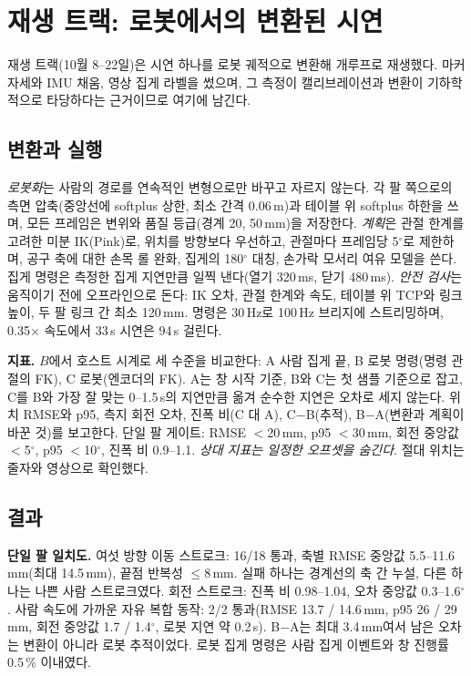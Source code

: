 \documentclass[conference,10pt]{IEEEtran}
\newcommand{\mm}{\,mm\xspace}
\begin{document}
\section{재생 트랙: 로봇에서의 변환된 시연}\label{sec:replay}
재생 트랙(10월 8--22일)은 시연 하나를 로봇 궤적으로 변환해 개루프로 재생했다. 마커 자세와 IMU 채움, 영상 집게 라벨을 썼으며,
그 측정이 캘리브레이션과 변환이 기하학적으로 타당하다는 근거이므로 여기에 남긴다.

\subsection{변환과 실행}
\emph{로봇화}는 사람의 경로를 연속적인 변형으로만 바꾸고 자르지 않는다. 각 팔 쪽으로의 측면 압축(중앙선에 softplus 상한, 최소 간격
0.06\,m)과 테이블 위 softplus 하한을 쓰며, 모든 프레임은 변위와 품질 등급(경계 20, 50\mm)을 저장한다. \emph{계획}은 관절 한계를
고려한 미분 IK(Pink)로, 위치를 방향보다 우선하고, 관절마다 프레임당 5$^\circ$로 제한하며, 공구 축에 대한 손목 롤 완화, 집게의
180$^\circ$ 대칭, 손가락 모서리 여유 모델을 쓴다. 집게 명령은 측정한 집게 지연만큼 일찍 낸다(열기 320\,ms, 닫기 480\,ms).
\emph{안전 검사}는 움직이기 전에 오프라인으로 돈다: IK 오차, 관절 한계와 속도, 테이블 위 TCP와 링크 높이, 두 팔 링크 간 최소
120\mm. 명령은 30\,Hz로 100\,Hz 브리지에 스트리밍하며, 0.35$\times$ 속도에서 33\,s 시연은 94\,s 걸린다.

\textbf{지표.} $B$에서 호스트 시계로 세 수준을 비교한다: A 사람 집게 끝, B 로봇 명령(명령 관절의 FK), C 로봇(엔코더의 FK). A는
창 시작 기준, B와 C는 첫 샘플 기준으로 잡고, C를 B와 가장 잘 맞는 0--1.5\,s의 지연만큼 옮겨 순수한 지연은 오차로 세지 않는다.
위치 RMSE와 p95, 측지 회전 오차, 진폭 비(C 대 A), C$-$B(추적), B$-$A(변환과 계획이 바꾼 것)를 보고한다. 단일 팔 게이트: RMSE
$<$20\mm, p95 $<$30\mm, 회전 중앙값 $<$5$^\circ$, p95 $<$10$^\circ$, 진폭 비 0.9--1.1. \emph{상대 지표는 일정한 오프셋을 숨긴다}.
절대 위치는 줄자와 영상으로 확인했다.

\subsection{결과}
\textbf{단일 팔 일치도.} 여섯 방향 이동 스트로크: 16/18 통과, 축별 RMSE 중앙값 5.5--11.6\mm(최대 14.5\mm), 끝점 반복성
$\le$8\mm. 실패 하나는 경계선의 축 간 누설, 다른 하나는 나쁜 사람 스트로크였다. 회전 스트로크: 진폭 비 0.98--1.04, 오차 중앙값
0.3--1.6$^\circ$. 사람 속도에 가까운 자유 복합 동작: 2/2 통과(RMSE 13.7 / 14.6\mm, p95 26 / 29\mm, 회전 중앙값 1.7 / 1.4$^\circ$,
로봇 지연 약 0.2\,s). B$-$A는 최대 3.4\mm{}여서 남은 오차는 변환이 아니라 로봇 추적이었다. 로봇 집게 명령은 사람 집게 이벤트와 창
진행률 0.5\,\% 이내였다.
\end{document}
